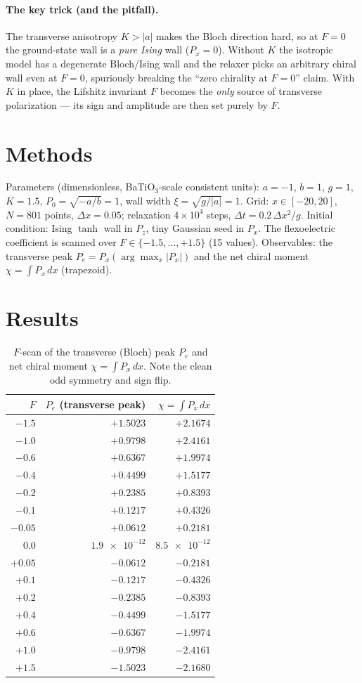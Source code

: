 \documentclass[11pt]{article}
\begin{document}
\paragraph{The key trick (and the pitfall).} The transverse anisotropy $K>|a|$
makes the Bloch direction hard, so at $F=0$ the ground-state wall is a
\emph{pure Ising} wall ($P_x=0$). Without $K$ the isotropic model has a
degenerate Bloch/Ising wall and the relaxer picks an arbitrary chiral wall even
at $F=0$, spuriously breaking the ``zero chirality at $F=0$'' claim. With $K$ in
place, the Lifshitz invariant $F$ becomes the \emph{only} source of transverse
polarization --- its sign and amplitude are then set purely by $F$.

\section{Methods}
Parameters (dimensionless, BaTiO$_3$-scale consistent units):
$a=-1$, $b=1$, $g=1$, $K=1.5$, $P_0=\sqrt{-a/b}=1$, wall width
$\xi=\sqrt{g/|a|}=1$. Grid: $x\in[-20,20]$, $N=801$ points,
$\Delta x=0.05$; relaxation $4\times10^4$ steps, $\Delta t=0.2\,\Delta x^2/g$.
Initial condition: Ising $\tanh$ wall in $P_z$, tiny Gaussian seed in $P_x$.
The flexoelectric coefficient is scanned over
$F\in\{-1.5,\dots,+1.5\}$ (15 values). Observables: the transverse peak
$P_e=P_x(\arg\max_x|P_x|)$ and the net chiral moment
$\chi=\int P_x\,dx$ (trapezoid).

\section{Results}
\begin{table}[h]
\centering
\caption{$F$-scan of the transverse (Bloch) peak $P_e$ and net chiral
moment $\chi=\int P_x\,dx$. Note the clean odd symmetry and sign flip.}
\begin{tabular}{rrr}
\toprule
$F$ & $P_e$ (transverse peak) & $\chi=\int P_x\,dx$ \\
\midrule
$-1.5$ & $+1.5023$ & $+2.1674$ \\
$-1.0$ & $+0.9798$ & $+2.4161$ \\
$-0.6$ & $+0.6367$ & $+1.9974$ \\
$-0.4$ & $+0.4499$ & $+1.5177$ \\
$-0.2$ & $+0.2385$ & $+0.8393$ \\
$-0.1$ & $+0.1217$ & $+0.4326$ \\
$-0.05$& $+0.0612$ & $+0.2181$ \\
$0.0$  & $\num{1.9e-12}$ & $\num{8.5e-12}$ \\
$+0.05$& $-0.0612$ & $-0.2181$ \\
$+0.1$ & $-0.1217$ & $-0.4326$ \\
$+0.2$ & $-0.2385$ & $-0.8393$ \\
$+0.4$ & $-0.4499$ & $-1.5177$ \\
$+0.6$ & $-0.6367$ & $-1.9974$ \\
$+1.0$ & $-0.9798$ & $-2.4161$ \\
$+1.5$ & $-1.5023$ & $-2.1680$ \\
\bottomrule
\end{tabular}
\end{table}
\end{document}
